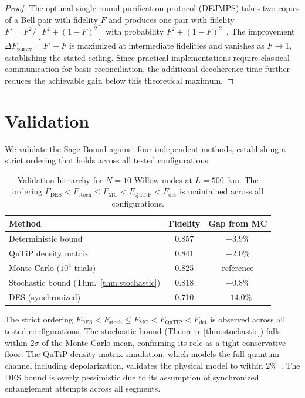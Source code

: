 \documentclass[aps,pra,reprint,amsmath,amssymb,superscriptaddress]{revtex4-2}
\begin{document}
\begin{proof}
The optimal single-round purification protocol (DEJMPS) takes two copies of a Bell pair with fidelity $F$ and produces one pair with fidelity $F' = F^2 / [F^2 + (1-F)^2]$ with probability $F^2 + (1-F)^2$~\cite{briegel1998}. The improvement $\Delta F_{\text{purify}} = F' - F$ is maximized at intermediate fidelities and vanishes as $F \to 1$, establishing the stated ceiling. Since practical implementations require classical communication for basis reconciliation, the additional decoherence time further reduces the achievable gain below this theoretical maximum.
\end{proof}


\section{Validation}

We validate the Sage Bound against four independent methods, establishing a strict ordering that holds across all tested configurations:

\begin{table}[h]
\caption{Validation hierarchy for $N=10$ Willow nodes at $L=500$~km. The ordering $F_{\text{DES}} < F_{\text{stoch}} \leq F_{\text{MC}} < F_{\text{QuTiP}} < F_{\text{det}}$ is maintained across all configurations.}
\label{tab:validation}
\begin{ruledtabular}
\begin{tabular}{lcc}
Method & Fidelity & Gap from MC \\
\hline
Deterministic bound & 0.857 & $+3.9\%$ \\
QuTiP density matrix & 0.841 & $+2.0\%$ \\
Monte Carlo ($10^4$ trials) & 0.825 & reference \\
Stochastic bound (Thm.~\ref{thm:stochastic}) & 0.818 & $-0.8\%$ \\
DES (synchronized) & 0.710 & $-14.0\%$ \\
\end{tabular}
\end{ruledtabular}
\end{table}

The strict ordering $F_{\text{DES}} < F_{\text{stoch}} \leq F_{\text{MC}} < F_{\text{QuTiP}} < F_{\text{det}}$ is observed across all tested configurations. The stochastic bound (Theorem~\ref{thm:stochastic}) falls within $2\sigma$ of the Monte Carlo mean, confirming its role as a tight conservative floor. The QuTiP density-matrix simulation, which models the full quantum channel including depolarization, validates the physical model to within $2\%$~\cite{qutip}. The DES bound is overly pessimistic due to its assumption of synchronized entanglement attempts across all segments.
\end{document}
